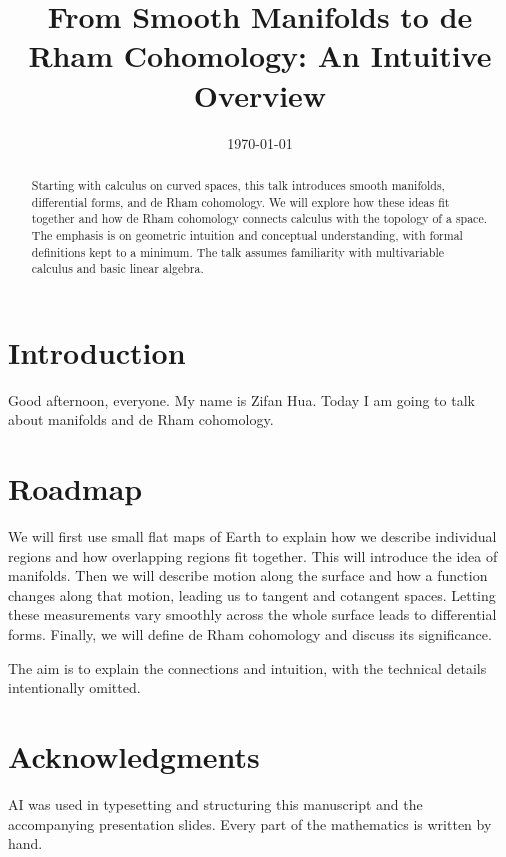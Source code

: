 \documentclass[11pt,a4paper]{article}
\title{From Smooth Manifolds to de Rham Cohomology: An Intuitive Overview}
\author{}
\date{\today}
\begin{document}
    \maketitle

    \begin{abstract}
        Starting with calculus on curved spaces, this talk introduces smooth
        manifolds, differential forms, and de Rham cohomology. We will explore
        how these ideas fit together and how de Rham cohomology connects
        calculus with the topology of a space. The emphasis is on geometric
        intuition and conceptual understanding, with formal definitions kept
        to a minimum. The talk assumes familiarity with multivariable calculus
        and basic linear algebra.
    \end{abstract}

    \section*{Introduction}
    Good afternoon, everyone. My name is Zifan Hua. Today I am going to talk
    about manifolds and de Rham cohomology.

    \section*{Roadmap}
    We will first use small flat maps of Earth to explain how we describe
    individual regions and how overlapping regions fit together. This will
    introduce the idea of manifolds. Then we will describe motion along the
    surface and how a function changes along that motion, leading us to
    tangent and cotangent spaces. Letting these measurements vary smoothly
    across the whole surface leads to differential forms. Finally, we will
    define de Rham cohomology and discuss its significance.

    The aim is to explain the connections and intuition, with the technical
    details intentionally omitted.

    

    

    

    

    

    \section*{Acknowledgments}
    AI was used in typesetting and structuring this manuscript and the
    accompanying presentation slides. Every part of the mathematics is written
    by hand.

    
    
\end{document}
